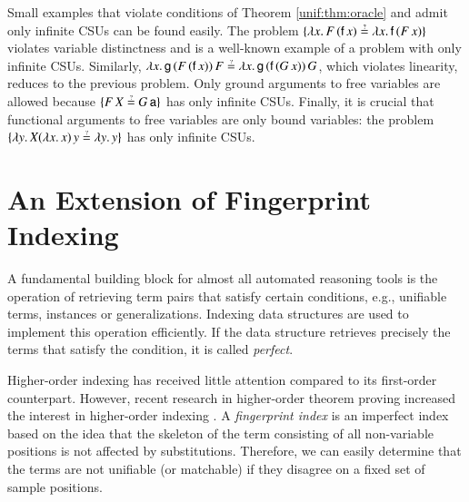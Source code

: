 Small examples that violate conditions of Theorem \ref{unif:thm:oracle} 
and admit only infinite CSUs can be found easily. The problem $\{ \lambda x.\, F \, (\cst{f} \, x) \unif \lambda x.\, \cst{f} \,
(F \, x) \}$ violates variable distinctness and is a well-known example of a problem with only infinite CSUs.
Similarly,
$\lambda x.\, \cst{g} \, (F \, (\cst{f} \, x)) \, F  \unif \lambda x.\, \cst{g}
\, (\cst{f} \, (G \, x)) \, G $, which violates linearity, reduces to the previous problem. 
Only ground arguments to free variables are allowed because  $\{F \, X \unif G
\, \cst{a}\}$ has only infinite CSUs. Finally, it is crucial that
functional arguments to free variables are only bound variables: the problem
$\{ \lambda y. \, X (\lambda x.\, x) \, y \unif \lambda y. \, y \}$ has only infinite CSUs.



\section{An Extension of Fingerprint Indexing}
\label{sec:unif:indexing}

A fundamental building block for almost all automated reasoning tools is the
operation of retrieving term pairs that satisfy certain conditions, e.g.,
unifiable terms, instances or generalizations. Indexing data structures are used
to implement this operation efficiently. If the data structure retrieves
precisely the terms that satisfy the condition, it is called \emph{perfect}.

Higher-order indexing has received little attention compared to its
first-order counterpart. However, recent research in higher-order theorem
proving increased the interest in higher-order indexing
\cite{ls-16-indexing,br-19-restricted-unif}.
A \emph{fingerprint index} \cite{ss-12-fp-indexing,vbss-19-ehoh1} is an imperfect index based on
the idea that the skeleton of the term consisting of all non-variable positions
is not affected by substitutions. Therefore, we can easily determine that the terms
are not unifiable (or matchable) if they disagree on a fixed set of sample
positions.

